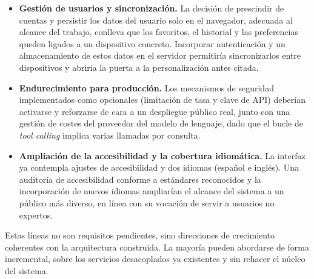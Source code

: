 \begin{itemize}
  \item \textbf{Gestión de usuarios y sincronización.} La decisión de prescindir
        de cuentas y persistir los datos del usuario solo en el navegador,
        adecuada al alcance del trabajo, conlleva que los favoritos, el historial y
        las preferencias queden ligados a un dispositivo concreto. Incorporar
        autenticación y un almacenamiento de estos datos en el servidor permitiría
        sincronizarlos entre dispositivos y abriría la puerta a la personalización
        antes citada.

  \item \textbf{Endurecimiento para producción.} Los mecanismos de seguridad
        implementados como opcionales (limitación de tasa y clave de API) deberían
        activarse y reforzarse de cara a un despliegue público real, junto con una
        gestión de costes del proveedor del modelo de lenguaje, dado que el bucle de
        \emph{tool calling} implica varias llamadas por consulta.

  \item \textbf{Ampliación de la accesibilidad y la cobertura idiomática.} La
        interfaz ya contempla ajustes de accesibilidad y dos idiomas (español e
        inglés). Una auditoría de accesibilidad conforme a estándares reconocidos y
        la incorporación de nuevos idiomas ampliarían el alcance del sistema a un
        público más diverso, en línea con su vocación de servir a usuarios no
        expertos.
\end{itemize}

Estas líneas no son requisitos pendientes, sino direcciones de crecimiento
coherentes con la arquitectura construida. La mayoría pueden abordarse de forma
incremental, sobre los servicios desacoplados ya existentes y sin rehacer el núcleo
del sistema.
